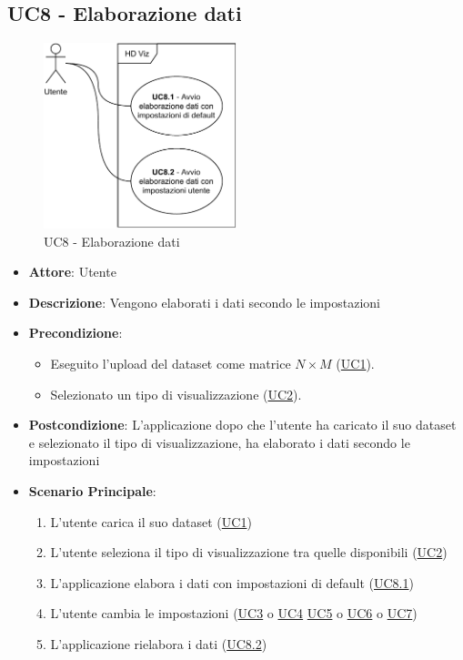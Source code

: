 \subsection{UC8 - Elaborazione dati}
    \label{uc8}
    
    \begin{figure}[htbp]
        \centering
        \includegraphics[width=0.5\textwidth]{source/sections/casi-uso/diagrams/uc8.pdf}
        \caption{UC8 - Elaborazione dati}
        \label{fig:uc8}
    \end{figure}
    
    \begin{itemize}
    \item \textbf{Attore}: Utente
    \item \textbf{Descrizione}: Vengono elaborati i dati secondo le impostazioni
    \item \textbf{Precondizione}: 
    \begin{itemize}
        \item Eseguito l'upload del dataset come matrice $N\times M$ (\hyperref[uc1]{UC1}).
        \item Selezionato un tipo di visualizzazione (\hyperref[uc2]{UC2}).
    \end{itemize}  
    \item \textbf{Postcondizione}: L'applicazione dopo che l'utente ha caricato il suo dataset e selezionato il tipo di visualizzazione, ha elaborato i dati secondo le impostazioni
    \item \textbf{Scenario Principale}: 
    \begin{enumerate}
        \item L'utente carica il suo dataset (\hyperref[uc1]{UC1})
        \item L'utente seleziona il tipo di visualizzazione tra quelle disponibili (\hyperref[uc2]{UC2})
        \item L'applicazione elabora i dati con impostazioni di default (\hyperref[uc8.1]{UC8.1})
        \item L'utente cambia le impostazioni (\hyperref[uc3]{UC3} o \hyperref[uc4]{UC4} \hyperref[uc5]{UC5} o \hyperref[uc6]{UC6} o \hyperref[uc7]{UC7})
        \item L'applicazione rielabora i dati (\hyperref[uc8.2]{UC8.2})
    \end{enumerate}
    \end{itemize}
    
